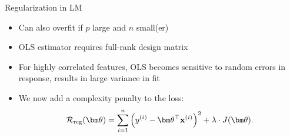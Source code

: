 \documentclass[11pt,compress,t,notes=noshow, xcolor=table]{beamer}
\begin{document}



\begin{vbframe}{Regularization in LM}

  \begin{itemize} \setlength{\itemsep}{1.3em}
  \item Can also overfit if $p$ large and $n$ small(er)
  \item OLS estimator requires full-rank design matrix
  \item For highly correlated features, OLS becomes sensitive to random errors in response, results in large variance in fit
  \item We now add a complexity penalty to the loss:
  $$
  \riskrt = \sumin \left(\yi - \thetav^\top \xi \right)^2 + \lambda \cdot J(\thetav). 
  $$ 
  \end{itemize}

\end{vbframe}






\end{document}
